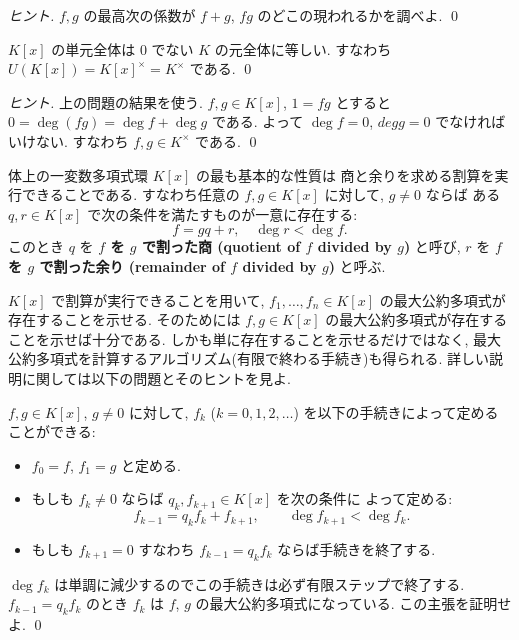 \documentclass[12pt,twoside]{jarticle}
\begin{document}
\begin{proof}[ヒント]
 $f,g$ の最高次の係数が $f+g$, $fg$ のどこの現われるかを調べよ. 
 \qed
\end{proof}


\begin{question}[多項式環の単元, 5点]
 $K[x]$ の単元全体は $0$ でない $K$ の元全体に等しい.
 すなわち $U(K[x])=K[x]^\times=K^\times$ である.
 \qed
\end{question}

\begin{proof}[ヒント]
 上の問題の結果を使う.
 $f,g\in K[x]$, $1=fg$ とすると $0=\deg(fg)=\deg f+\deg g$ である.
 よって $\deg f=0$, $deg g=0$ でなければいけない.
 すなわち $f,g\in K^\times$ である.
 \qed
\end{proof}


体上の一変数多項式環 $K[x]$ の最も基本的な性質は
商と余りを求める割算を実行できることである.
すなわち任意の $f,g\in K[x]$ に対して, $g\ne 0$ ならば
ある $q,r\in K[x]$ で次の条件を満たすものが一意に存在する:
\begin{equation*}
 f = gq + r, \quad \deg r < \deg f.
\end{equation*}
このとき $q$ を %
{\bf $f$ を $g$ で割った商 (quotient of $f$ divided by $g$)} と呼び, 
$r$ を %
{\bf $f$ を $g$ で割った余り (remainder of $f$ divided by $g$)} 
と呼ぶ.


$K[x]$ で割算が実行できることを用いて, 
$f_1,\ldots,f_n\in K[x]$ の最大公約多項式が存在することを示せる.
そのためには $f,g\in K[x]$ の最大公約多項式が存在することを示せば十分である.
しかも単に存在することを示せるだけではなく, 
最大公約多項式を計算するアルゴリズム(有限で終わる手続き)も得られる.
詳しい説明に関しては以下の問題とそのヒントを見よ.

\begin{question}
\label{q:Euclidean-algorithm-1-K[x]}
  $f,g\in K[x]$, $g\ne 0$ に対して, 
  $f_k$ ($k=0,1,2,\dots$) を以下の手続きによって定めることができる:
  \begin{itemize}
  \item $f_0=f$, $f_1=g$ と定める.
  \item もしも $f_k\ne 0$ ならば $q_k, f_{k+1}\in K[x]$ を次の条件に
    よって定める:
    \begin{equation*}
      f_{k-1} = q_k f_k + f_{k+1}, \qquad \deg f_{k+1} < \deg f_k.
    \end{equation*}
  \item もしも $f_{k+1}=0$ すなわち $f_{k-1}=q_kf_k$ ならば手続きを終了する.
  \end{itemize}
  $\deg f_k$ は単調に減少するのでこの手続きは必ず有限ステップで終了する.
  $f_{k-1}=q_kf_k$ のとき $f_k$ は $f$, $g$ の最大公約多項式になっている.
  この主張を証明せよ.
  \qed
\end{question}
\end{document}

